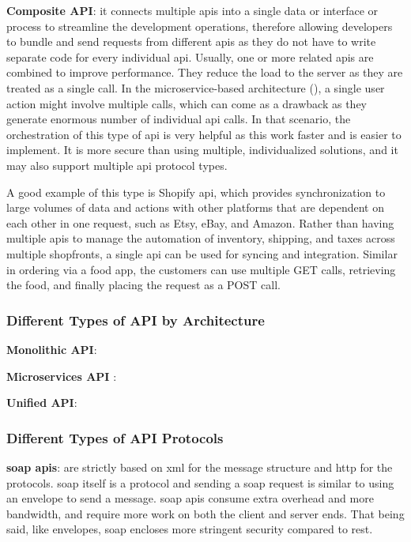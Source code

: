 \begin{multicols}{2}
      \textbf{Composite API}: it connects multiple \acrshort{api}s into a single data or interface or process to 
      streamline the development operations, therefore allowing developers to bundle and send requests from different 
      \acrshort{api}s as they do not have to write separate code for every individual \acrshort{api}. Usually,
      one or more related \acrshort{api}s are combined to improve performance. They reduce the load to the server
      as they are treated as a single call. In the microservice-based architecture 
      (\textit{}), a single user action might involve multiple calls, which can come as 
      a drawback as they generate enormous number of individual \acrshort{api} calls. In that scenario, the orchestration 
      of this type of \acrshort{api} is very helpful as this work faster and is easier to implement. It is more secure 
      than using multiple, individualized solutions, and it may also support multiple \acrshort{api} protocol types.

      A good example of this type is Shopify \acrshort{api}, which provides synchronization to large volumes of data and
      actions with other platforms that are dependent on each other in one request, such as Etsy, eBay, and Amazon. Rather 
      than having multiple \acrshort{api}s to manage the automation of inventory, shipping, and taxes across multiple shopfronts, 
      a single \acrshort{api} can be used for syncing and integration. Similar in ordering via a food app, the customers can
      use multiple GET calls, retrieving the food, and finally placing the request as a POST call. 
      \subsubsection{Different Types of API by Architecture}
      \textbf{Monolithic API}:

      \textbf{Microservices API} \label{microservicesapi}:

      \textbf{Unified API}:

      \subsubsection{Different Types of API Protocols}\label{chap:typesofapis}
      \textbf{\acrshort{soap} \acrshort{api}s}: are strictly based on \acrshort{xml} for the message structure and
      \acrshort{http} for the protocols. \acrshort{soap} itself is a protocol and sending a \acrshort{soap}
      request is similar to using an envelope to send a message. \acrshort{soap} \acrshort{api}s consume extra
      overhead and more bandwidth, and require more work on both the client and server ends. That being said,
      like envelopes, \acrshort{soap} encloses more stringent security compared to \acrshort{rest}.
\end{multicols}

